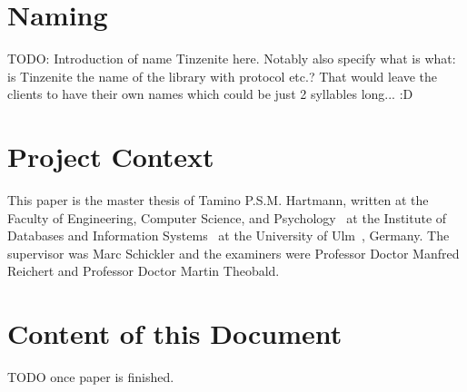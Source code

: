 \section{Naming}

TODO: Introduction of name Tinzenite here.
Notably also specify what is what: is Tinzenite the name of the library with protocol etc.?
That would leave the clients to have their own names which could be just 2 syllables long... :D

\section{Project Context}

This paper is the master thesis of Tamino P.S.M. Hartmann, written at the Faculty of Engineering, Computer Science, and Psychology~\cite{web:site:faculty} at the Institute of Databases and Information Systems~\cite{web:site:institute} at the University of Ulm~\cite{web:site:uni_ulm}, Germany.
The supervisor was Marc Schickler and the examiners were Professor Doctor Manfred Reichert and Professor Doctor Martin Theobald.

\section{Content of this Document}

TODO once paper is finished.

